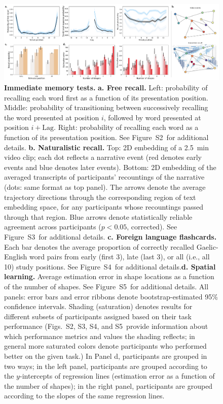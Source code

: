 \documentclass[10pt]{article}
\newcommand{\frDetail}{S2}
\newcommand{\natDetail}{S3}
\newcommand{\vocabDetail}{S4}
\newcommand{\spatialDetail}{S5}
\begin{document}
\begin{figure}[tp]
\centering
\includegraphics[width=1\textwidth]{figs/behavior_overview_immediate}
\caption{\textbf{Immediate memory tests.}  \textbf{a. Free recall.}
  Left: probability of recalling each word first as a function of its
  presentation position.  Middle: probability of transitioning between
successively recalling the word presented at position $i$, followed by
word presented at position $i + \mathrm{Lag}$.  Right: probability of
recalling each word as a function of its presentation position.  See
Figure~\frDetail~for additional details.
\textbf{b. Naturalistic recall.}  Top: 2D embedding of a 2.5~min video
clip; each dot reflects a narrative event (red denotes early events
and blue denotes later events).  Bottom: 2D embedding of the averaged
transcripts of participants' recountings of the narrative (dots: same
format as top panel).  The arrows denote the average trajectory
directions through the corresponding region of text embedding space,
for any participants whose recountings passed through that region.
Blue arrows denote statistically reliable agreement across
participants ($p < 0.05$, corrected).  See Figure~\natDetail~for
additional details.  \textbf{c. Foreign language
  flashcards.} Each bar denotes the average proportion of correctly
recalled Gaelic-English word pairs from early (first 3), late (last
3), or all (i.e., all 10) study positions.  See
Figure~\vocabDetail~for additional details.\textbf{d. Spatial
  learning.}  Average estimation error in shape locations as a
function of the number of shapes.  See Figure~\spatialDetail~for
additional details.  All panels: error bars and error
ribbons denote bootstrap-estimated 95\% confidence intervals.  Shading
(saturation) denotes results for different subsets of participants
assigned based on their task performance (Figs.~\frDetail,
\natDetail, \vocabDetail, and \spatialDetail~provide information about
which performance metrics and values the shading reflects; in general
more saturated colors denote participants who performed better on the
given task.)  In Panel d, participants are grouped in two ways; in the
left panel, participants are grouped according to the $y$-intercepts of regression lines (estimation error as a
function of the number of shapes); in the right panel, participants
are grouped according to the slopes of the same regression lines.}
\label{fig:immediate_behavior}
\end{figure}
\end{document}
